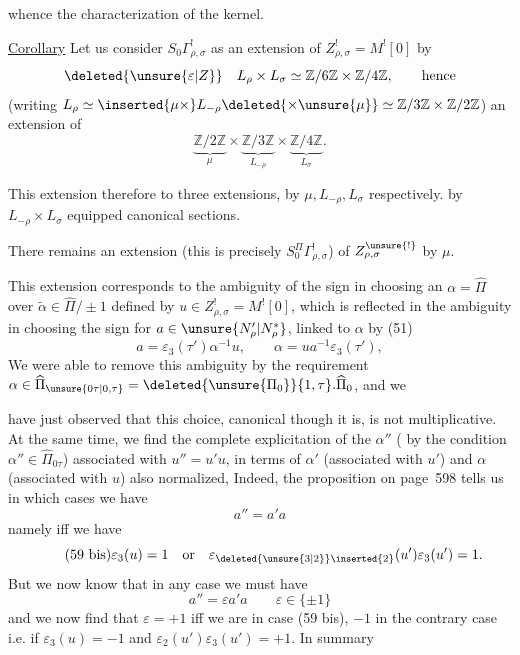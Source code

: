 
whence the characterization of the kernel.

\uline{Corollary} Let us consider  $S_0\Gamma^!_{\rho,\sigma}$ as an extension of $Z^!_{\rho,\sigma}=M^![0]$ by
\[
\deleted{\unsure{\varepsilon|Z}}\quad
L_\rho\times L_\sigma\simeq\mathbb Z/6\mathbb Z\times\mathbb Z/4\mathbb Z,
\qquad\text{hence}
\]
(writing $L_\rho\simeq\inserted{\mu\times}L_{-\rho}\deleted{\times\unsure{\mu}}\simeq\mathbb Z/3\mathbb Z\times\mathbb Z/2\mathbb Z$)
an extension of
\[
\underbrace{\mathbb Z/2\mathbb Z}_{\mu}\times
\underbrace{\mathbb Z/3\mathbb Z}_{L_{-\rho}}\times
\underbrace{\mathbb Z/4\mathbb Z}_{L_\sigma}.
\]


This extension  therefore  to three extensions, by $\mu,L_{-\rho},L_\sigma$ respectively.   by $L_{-\rho}\times L_\sigma$  equipped  canonical sections.

There remains an extension (this is precisely $S_0^\Pi\Gamma^!_{\rho,\sigma}$) of $Z^{\unsure{!}}_{\rho,\sigma}$ by $\mu$.

This extension corresponds  to the ambiguity of the sign in choosing an $\alpha=\widehat\Pi$ over $\widetilde\alpha\in\widehat\Pi/\pm1$ defined by $u\in Z^!_{\rho,\sigma}=M^![0]$, which is reflected in the ambiguity in choosing the sign for $a\in\unsure{N'_\rho|N_\rho^*}$, linked to $\alpha$ by (51)
\[
\tag{58}
a=\varepsilon_3(\tau')\alpha^{-1}u,
\qquad \alpha=ua^{-1}\varepsilon_3(\tau'),
\]
We were able to remove this ambiguity by the requirement
$\alpha\in\widehat\Pi_{\unsure{0\tau|0,\tau}}=\deleted{\unsure{\Pi_0}}\{1,\tau\}.\widehat\Pi_0$, and we



have just observed that this choice, canonical though it is, is not multiplicative. At the same time, we find the complete explicitation of the $\alpha''$ (  by the condition $\alpha''\in\widehat\Pi_{0\tau}$) associated with $u''=u'u$, in terms of $\alpha'$ (associated with $u'$) and $\alpha$ (associated with $u$) also normalized,  Indeed, the proposition on page\ 598 tells us in which cases  we have
\[
\tag{59} a''=a'a
\]
namely iff we have
\[
\tag{59 bis}
\varepsilon_3(u)=1\quad\text{or}\quad
\varepsilon_{\deleted{\unsure{3|2}}\inserted{2}}(u')\varepsilon_3(u')=1.
\]
But we now know that in any case we must have
\[
\tag{60}
a''=\varepsilon a'a\qquad \varepsilon\in\{\pm1\}
\]
and we now find that $\varepsilon=+1$ iff we are in case (59 bis), $-1$ in the contrary case i.e. if $\varepsilon_3(u)=-1$ and $\varepsilon_2(u')\varepsilon_3(u')=+1$. In summary

